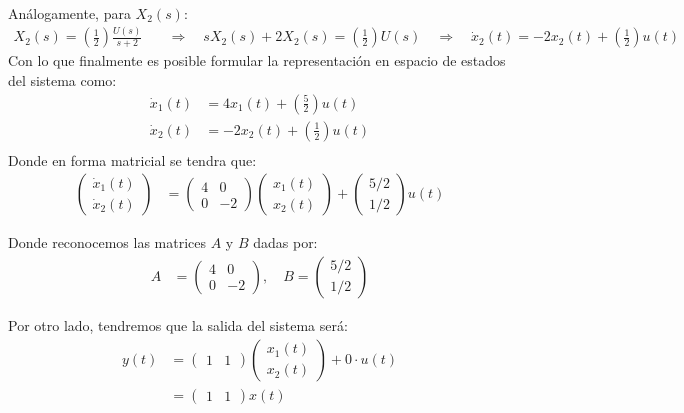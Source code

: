 \documentclass[
  11pt,
  letterpaper,
   addpoints,
   answers
  ]{exam}
\begin{document}
\begin{questions}
\begin{solution}
\begin{align}
\end{align}
Análogamente, para $X_2(s)$:
\begin{align}
  X_2(s) = \left(\frac{1}{2}\right)\frac{U(s)}{s+2} \quad &\Longrightarrow \quad sX_2(s) + 2X_2(s) = \left(\frac{1}{2}\right)U(s) \quad \Longrightarrow \quad \dot{x}_2(t) = -2x_2(t) + \left(\frac{1}{2}\right)u(t)
\end{align}
Con lo que finalmente es posible formular la representación en espacio de estados del sistema como:
\begin{align}
  \dot{x}_1(t) &= 4x_1(t) + \left(\frac{5}{2}\right)u(t) \\
  \dot{x}_2(t) &= -2x_2(t) + \left(\frac{1}{2}\right)u(t) \\
\end{align}
Donde en forma matricial se tendra que:
\begin{align}
  \begin{pmatrix}
    \dot{x}_1(t) \\ \dot{x}_2(t)
  \end{pmatrix}
  &=
  \begin{pmatrix}
    4 & 0 \\
    0 & -2
  \end{pmatrix}
  \begin{pmatrix}
    x_1(t) \\ x_2(t)
  \end{pmatrix}
  +
  \begin{pmatrix}
   5/2 \\
    1/2
  \end{pmatrix}
  u(t) 
\end{align}

Donde reconocemos las matrices $A$ y $B$ dadas por:
\begin{align}
  A &= \begin{pmatrix}
    4 & 0 \\
    0 & -2
  \end{pmatrix}, \quad
  B = \begin{pmatrix}
    5/2 \\ 1/2
  \end{pmatrix}
\end{align}

Por otro lado, tendremos que la salida del sistema será:
\begin{align}
  y(t) &= \begin{pmatrix} 1 & 1 \end{pmatrix} \begin{pmatrix} x_1(t) \\ x_2(t) \end{pmatrix} + 0 \cdot u(t) \\
  &= \begin{pmatrix} 1 & 1 \end{pmatrix} x(t) 
\end{align}
  


\end{solution}
\end{questions}
\end{document}
